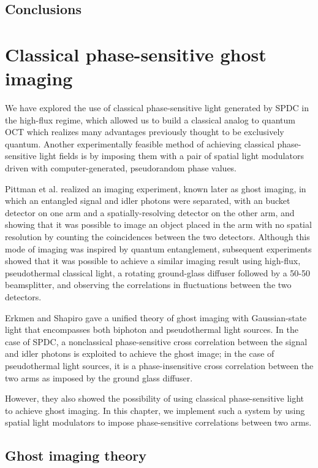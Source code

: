 \documentclass{report}
\begin{document}
\section{Conclusions}

\chapter{Classical phase-sensitive ghost imaging}
We have explored the use of classical phase-sensitive light generated by SPDC in the high-flux regime, which allowed us to build a classical analog to quantum OCT which realizes many advantages previously thought to be exclusively quantum. Another experimentally feasible method of achieving classical phase-sensitive light fields is by imposing them with a pair of spatial light modulators driven with computer-generated, pseudorandom phase values.

Pittman et al. realized an imaging experiment, known later as ghost imaging, in which an entangled signal and idler photons were separated, with an bucket detector on one arm and a spatially-resolving detector on the other arm, and showing that it was possible to image an object placed in the arm with no spatial resolution by counting the coincidences between the two detectors. Although this mode of imaging was inspired by quantum entanglement, subsequent experiments showed that it was possible to achieve a similar imaging result using high-flux, pseudothermal classical light, a rotating ground-glass diffuser followed by a 50-50 beamsplitter, and observing the correlations in fluctuations between the two detectors.

Erkmen and Shapiro gave a unified theory of ghost imaging with Gaussian-state light that encompasses both biphoton and pseudothermal light sources. In the case of SPDC, a nonclassical phase-sensitive cross correlation between the signal and idler photons is exploited to achieve the ghost image; in the case of pseudothermal light sources, it is a phase-insensitive cross correlation between the two arms as imposed by the ground glass diffuser.

However, they also showed the possibility of using classical phase-sensitive light to achieve ghost imaging. In this chapter, we implement such a system by using spatial light modulators to impose phase-sensitive correlations between two arms.

\section{Ghost imaging theory}
\end{document}
